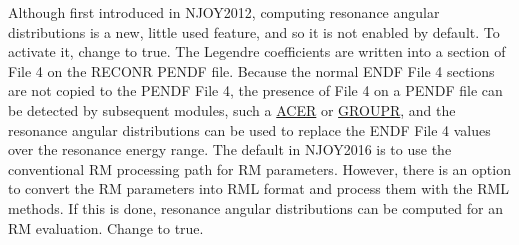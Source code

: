 Although first introduced in NJOY2012, computing resonance
angular distributions is a new, little used feature, and so
it is not enabled by default.  To activate it, change
to true.  The Legendre coefficients are written into a section of
File 4 on the RECONR PENDF file.  Because the normal
ENDF File 4 sections are not copied to the PENDF File 4, the
presence of File 4 on a PENDF file can be detected by subsequent modules,
such a \hyperlink{sACERhy}{ACER} or
\hyperlink{sGROUPRhy}{GROUPR}, and the resonance
angular distributions can be used to replace the ENDF File 4 values
over the resonance energy range.  The default in NJOY2016 is to use
the conventional RM processing path for RM parameters.
However, there is an option to convert the RM parameters
into RML format and process them with the
RML methods.  If this is done, resonance angular distributions can be
computed for an RM evaluation.  Change 
 to true.

